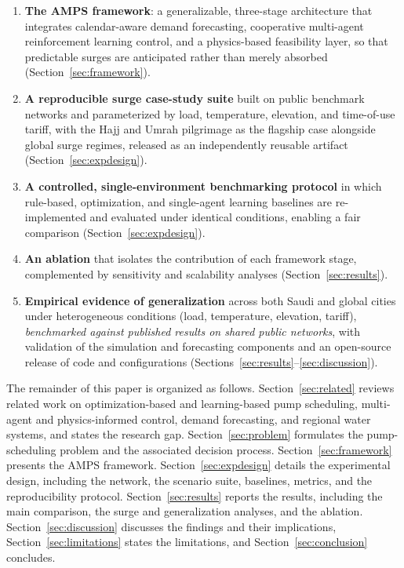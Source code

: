 \documentclass[11pt,a4paper]{article}
\begin{document}
\begin{enumerate}
  \item \textbf{The AMPS framework}: a generalizable, three-stage architecture
  that integrates calendar-aware demand forecasting, cooperative multi-agent
  reinforcement learning control, and a physics-based feasibility layer, so that
  predictable surges are anticipated rather than merely absorbed
  (Section~\ref{sec:framework}).
  \item \textbf{A reproducible surge case-study suite} built on public benchmark
  networks and parameterized by load, temperature, elevation, and time-of-use
  tariff, with the Hajj and Umrah pilgrimage as the flagship case alongside
  global surge regimes, released as an independently reusable artifact
  (Section~\ref{sec:expdesign}).
  \item \textbf{A controlled, single-environment benchmarking protocol} in which
  rule-based, optimization, and single-agent learning baselines are
  re-implemented and evaluated under identical conditions, enabling a fair
  comparison (Section~\ref{sec:expdesign}).
  \item \textbf{An ablation} that isolates the contribution of each framework
  stage, complemented by sensitivity and scalability analyses
  (Section~\ref{sec:results}).
  \item \textbf{Empirical evidence of generalization} across both Saudi and
  global cities under heterogeneous conditions (load, temperature, elevation,
  tariff), \emph{benchmarked against published results on shared public
  networks}, with validation of the simulation and forecasting components and an
  open-source release of code and configurations
  (Sections~\ref{sec:results}--\ref{sec:discussion}).
\end{enumerate}

The remainder of this paper is organized as follows.
Section~\ref{sec:related} reviews related work on optimization-based and
learning-based pump scheduling, multi-agent and physics-informed control, demand
forecasting, and regional water systems, and states the research gap.
Section~\ref{sec:problem} formulates the pump-scheduling problem and the
associated decision process.
Section~\ref{sec:framework} presents the AMPS framework.
Section~\ref{sec:expdesign} details the experimental design, including the
network, the scenario suite, baselines, metrics, and the reproducibility
protocol.
Section~\ref{sec:results} reports the results, including the main comparison,
the surge and generalization analyses, and the ablation.
Section~\ref{sec:discussion} discusses the findings and their implications,
Section~\ref{sec:limitations} states the limitations, and
Section~\ref{sec:conclusion} concludes.
\end{document}
